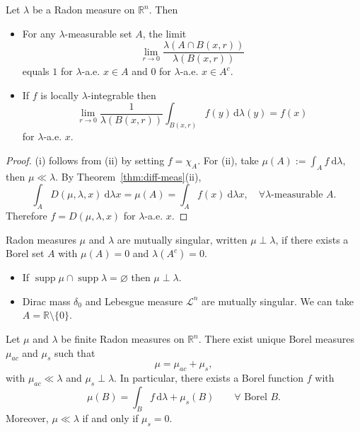 \begin{corollary}\label{cor:Lebesgue-diff}
Let $\lambda$ be a Radon measure on $\mathbb{R}^{n}$. Then
\begin{itemize}
\item[(i)] For any $\lambda$-measurable set $A$, the limit
$$
\lim_{r\to 0}\frac{\lambda(A\cap B(x,r))}{\lambda(B(x,r))}
$$
equals $1$ for $\lambda$-a.e. $x\in A$ and $0$ for $\lambda$-a.e. $x\in A^{c}$.
\item[(ii)] If $f$ is locally $\lambda$-integrable then
$$
\lim_{r\to 0}\frac{1}{\lambda(B(x,r))}\int_{B(x,r)}f(y)\,\mathrm{d}\lambda(y)=f(x)
$$
for $\lambda$-a.e. $x$.
\end{itemize}
\end{corollary}

\begin{proof}
    (i) follows from (ii) by setting $f=\chi_{A}$. For (ii), take $\mu(A):=\displaystyle \int_{A}f\ \mathrm{d}\lambda$, then $\mu\ll \lambda$. By Theorem~\ref{thm:diff-meas}(ii),
    $$
    \int _{A}D(\mu,\lambda,x)\ \mathrm{d}\lambda x=\mu(A)=\int _{A}f(x)\ \mathrm{d}\lambda x, \quad\forall \lambda \text{-measurable }A.
    $$
    Therefore $f=D(\mu,\lambda,x)$ for $\lambda$-a.e. $x$.
\end{proof}

\begin{definition}
Radon measures $\mu$ and $\lambda$ are mutually singular, written $\mu\perp\lambda$, if there exists a Borel set $A$ with $\mu(A)=0$ and $\lambda(A^{c})=0$.
\end{definition}

\begin{example}
\begin{itemize}
\item[(i)] If $\operatorname{supp}\mu\cap\operatorname{supp}\lambda=\varnothing$ then $\mu\perp\lambda$.
\item[(ii)] Dirac mass $\delta_{0}$ and Lebesgue measure $\mathcal{L}^{n}$ are mutually singular. We can take $A= \mathbb{R}\setminus \{ 0 \}$.
\end{itemize}
\end{example}

\begin{theorem}\label{thm:Lebesgue-decomp}
Let $\mu$ and $\lambda$ be finite Radon measures on $\mathbb{R}^{n}$. There exist unique Borel measures $\mu_{ac}$ and $\mu_{s}$ such that
$$\mu=\mu_{ac}+\mu_{s},$$
with $\mu_{ac}\ll\lambda$ and $\mu_{s}\perp\lambda$. In particular, there exists a Borel function $f$ with
$$\mu(B)=\int_{B}f\,\mathrm{d}\lambda+\mu_{s}(B)\qquad\forall\text{ Borel }B.
$$
Moreover, $\mu\ll \lambda$ if and only if $\mu_{s}=0$.
\end{theorem}

